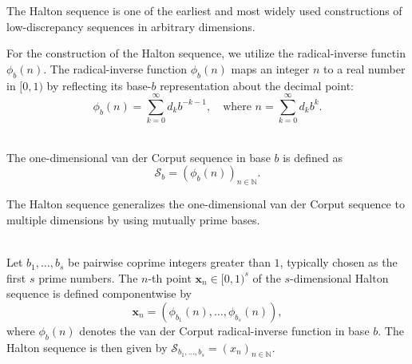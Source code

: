 The Halton sequence is one of the earliest and most widely used constructions of
low-discrepancy sequences in arbitrary dimensions. 

For the construction of the Halton sequence, we utilize the radical-inverse
functin $\phi_b(n)$. The radical-inverse function $\phi_b(n)$ maps an integer
$n$ to a real number in $[0,1)$ by reflecting its base-$b$ representation about
the decimal point:
\begin{equation*}
    \phi_b(n) = \sum_{k=0}^\infty d_k b^{-k-1}, \quad \text{where } n = \sum_
    {k=0}^\infty d_k b^k.
\end{equation*}

\begin{definition} \ \\
The one-dimensional van der Corput sequence in base $b$ is defined as
\begin{equation*}
    \mathcal{S}_b = \left( \phi_b(n) \right)_{n\in \mathbb{N}}.
\end{equation*}
\end{definition}

The Halton sequence generalizes the one-dimensional van der Corput sequence to
multiple dimensions by using mutually prime bases.

\begin{definition} \ \\
Let $b_1, \dots, b_s$ be pairwise coprime integers greater than $1$, typically
chosen as the first $s$ prime numbers. The $n$-th point $\boldsymbol{x}_n \in
[0,1)^s$ of the $s$-dimensional Halton sequence is defined componentwise by
\begin{equation*}
    \boldsymbol{x}_n = \left( \phi_{b_1}(n), \dots, \phi_{b_s}(n) \right),
\end{equation*}
where $\phi_b(n)$ denotes the van der Corput radical-inverse function in base
$b$. The Halton sequence is then given by $\mathcal{S}_{b_1, \dots, b_s} = (x_n)_{n\in \mathbb{N}}$.
\end{definition}

